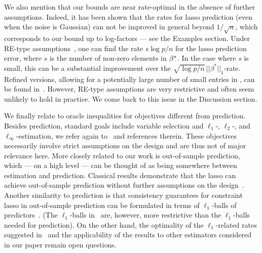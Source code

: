 \documentclass[bj]{imsart}
\newcommand{\normone}[1]{\ensuremath{\!|\!| #1 | \! |_{1}}}
\newcommand{\1}{{\rm 1}\mskip -4,5mu{\rm l} }
\newcommand{\betatrue}{\beta^*}
\begin{document}
We also mention that our bounds are near rate-optimal in the absence of further assumptions. Indeed, it has been shown that the rates for lasso prediction \cite[Proposition~4]{ArnakMoYo14} (even when the noise is Gaussian) can not be improved in general beyond $1/\sqrt n$, which corresponds to our bound up to log-factors --- see the Examples section. Under RE-type assumptions~\cite{Sara09}, one can find the rate ${s\log p}/{n}$ for the lasso prediction error, where $s$ is the number of non-zero elements in $\textcolor{black}{\beta^*}$. In the case where $s$ is small, this can be a substantial improvement over the $\sqrt{\log p/n}\,\normone{\betatrue}$-rate. Refined versions, allowing for a potentially large number of small entries in \truth, can be found in~\cite{vdGeer11}. However, RE-type assumptions are very restrictive and often seem unlikely to hold in practice. We come back to this issue in the Discussion section.

We finally relate to oracle inequalities for objectives different from prediction. Besides prediction, standard goals include variable selection and $\ell_1$-, $\ell_2$-, and $\ell_\infty$-estimation, we refer again to~\cite{Buhlmann11,Hastie15} and references therein. These objectives necessarily involve strict assumptions on the design and are thus not of major relevance here. More closely related to our work is out-of-sample prediction, which --- on a high level --- can be thought of as being somewhere between estimation and prediction. Classical results demonstrate that the  lasso can achieve out-of-sample prediction without further assumptions on the design~\cite{Greenshtein04}. Another similarity to prediction is that consistency guarantees for constraint lasso in out-of-sample prediction can be formulated in terms of $\ell_1$-balls of predictors~\cite[Theorems~1 and~3]{Greenshtein04}. (The $\ell_1$-balls in~\cite{Greenshtein04} are, however, more restrictive than the $\ell_1$-balls needed for prediction). On the other hand, the optimality of the $\ell_1$-related rates suggested in~\cite{Greenshtein04} and the applicability of the results to other estimators considered in our paper remain open questions.
\newcommand{\tuningrelax}{\textcolor{black}{\ensuremath{c}}}
\end{document}

